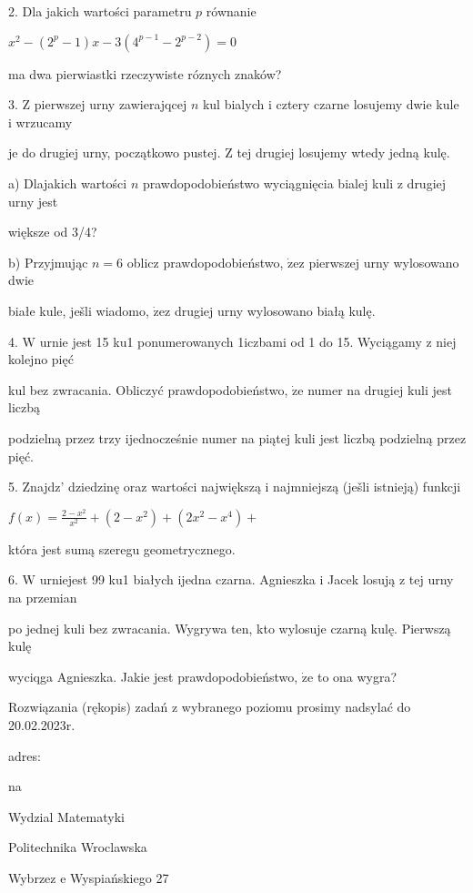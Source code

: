 \documentclass[a4paper,12pt]{article}
\begin{document}
2. Dla jakich wartości parametru $p$ równanie

$x^{2}-(2^{p}-1)x-3(4^{p-1}-2^{p-2})=0$

ma dwa pierwiastki rzeczywiste róznych znaków?

3. $\mathrm{Z}$ pierwszej urny zawierajqcej $n$ kul bialych $\mathrm{i}$ cztery czarne losujemy dwie kule $\mathrm{i}$ wrzucamy

je do drugiej urny, początkowo pustej. $\mathrm{Z}$ tej drugiej losujemy wtedy jedną kulę.

a) Dlajakich wartości $n$ prawdopodobieństwo wyciągnięcia bialej kuli $\mathrm{z}$ drugiej urny jest

większe od 3/4?

b) Przyjmując $n=6$ oblicz prawdopodobieństwo, $\dot{\mathrm{z}}\mathrm{e}\mathrm{z}$ pierwszej urny wylosowano dwie

białe kule, ješli wiadomo, $\dot{\mathrm{z}}\mathrm{e}\mathrm{z}$ drugiej urny wylosowano białą kulę.

4. $\mathrm{W}$ urnie jest 15 ku1 ponumerowanych 1iczbami od 1 do 15. Wyciągamy $\mathrm{z}$ niej kolejno pięć

kul bez zwracania. Obliczyć prawdopodobieństwo, $\dot{\mathrm{z}}\mathrm{e}$ numer na drugiej kuli jest liczbą

podzielną przez trzy ijednocześnie numer na piątej kuli jest liczbą podzielną przez pięć.

5. Znajdz' dziedzinę oraz wartości największą $\mathrm{i}$ najmniejszą (ješli istnieją) funkcji

$f(x)=\displaystyle \frac{2-x^{2}}{x^{2}}+(2-x^{2})+(2x^{2}-x^{4})+$

która jest sumą szeregu geometrycznego.

6. $\mathrm{W}$ urniejest 99 ku1 białych ijedna czarna. Agnieszka $\mathrm{i}$ Jacek losują $\mathrm{z}$ tej urny na przemian

po jednej kuli bez zwracania. Wygrywa ten, kto wylosuje czarną kulę. Pierwszą kulę

wyciqga Agnieszka. Jakie jest prawdopodobieństwo, $\dot{\mathrm{z}}\mathrm{e}$ to ona wygra?

Rozwiązania (rękopis) zadań z wybranego poziomu prosimy nadsylać do 20.02.2023r.

adres:

na

Wydzial Matematyki

Politechnika Wroclawska

Wybrzez $\mathrm{e}$ Wyspiańskiego 27
\end{document}
